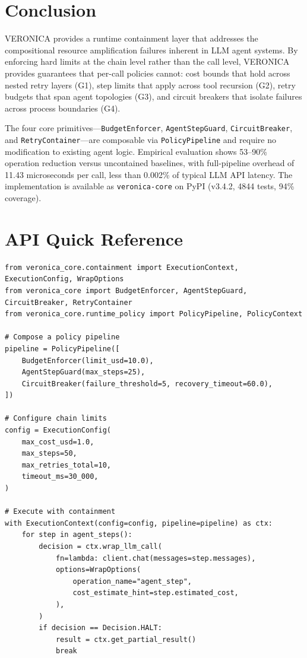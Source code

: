 \documentclass[11pt]{article}
\begin{document}
\section{Conclusion}
\label{sec:conclusion}

VERONICA provides a runtime containment layer that addresses the compositional
resource amplification failures inherent in LLM agent systems. By enforcing
hard limits at the chain level rather than the call level, VERONICA provides
guarantees that per-call policies cannot: cost bounds that hold across nested
retry layers (G1), step limits that apply across tool recursion (G2), retry
budgets that span agent topologies (G3), and circuit breakers that isolate
failures across process boundaries (G4).

The four core primitives---\texttt{BudgetEnforcer}, \texttt{AgentStepGuard},
\texttt{CircuitBreaker}, and \texttt{RetryContainer}---are composable via
\texttt{PolicyPipeline} and require no modification to existing agent logic.
Empirical evaluation shows 53--90\% operation reduction versus uncontained
baselines, with full-pipeline overhead of 11.43 microseconds per call, less
than 0.002\% of typical LLM API latency. The implementation is available as
\texttt{veronica-core} on PyPI (v3.4.2, 4844 tests, 94\% coverage).




\appendix

\section{API Quick Reference}
\label{sec:appendix-api}

\begin{lstlisting}
from veronica_core.containment import ExecutionContext, ExecutionConfig, WrapOptions
from veronica_core import BudgetEnforcer, AgentStepGuard, CircuitBreaker, RetryContainer
from veronica_core.runtime_policy import PolicyPipeline, PolicyContext

# Compose a policy pipeline
pipeline = PolicyPipeline([
    BudgetEnforcer(limit_usd=10.0),
    AgentStepGuard(max_steps=25),
    CircuitBreaker(failure_threshold=5, recovery_timeout=60.0),
])

# Configure chain limits
config = ExecutionConfig(
    max_cost_usd=1.0,
    max_steps=50,
    max_retries_total=10,
    timeout_ms=30_000,
)

# Execute with containment
with ExecutionContext(config=config, pipeline=pipeline) as ctx:
    for step in agent_steps():
        decision = ctx.wrap_llm_call(
            fn=lambda: client.chat(messages=step.messages),
            options=WrapOptions(
                operation_name="agent_step",
                cost_estimate_hint=step.estimated_cost,
            ),
        )
        if decision == Decision.HALT:
            result = ctx.get_partial_result()
            break
\end{lstlisting}
\end{document}
